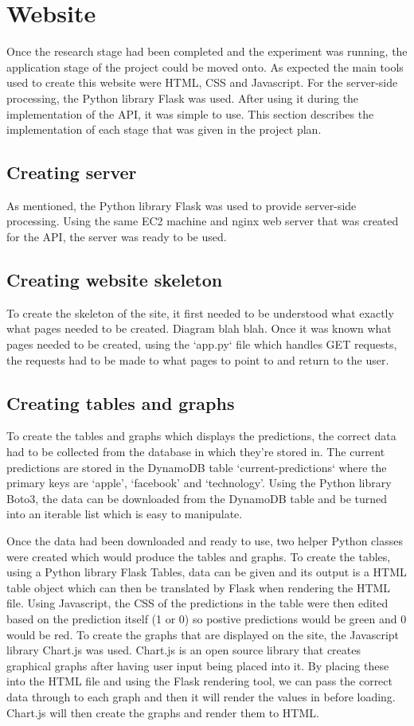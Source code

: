 \documentclass[a4paper,11pt]{report}
\begin{document}
\section{Website}
Once the research stage had been completed and the experiment was running, the application stage of the project could be moved onto. As expected the main tools used to create this website were HTML, CSS and Javascript. For the server-side processing, the Python library Flask was used. After using it during the implementation of the API, it was simple to use. This section describes the implementation of each stage that was given in the project plan.

\subsection{Creating server}
As mentioned, the Python library Flask was used to provide server-side processing. Using the same EC2 machine and nginx web server that was created for the API, the server was ready to be used.

\subsection{Creating website skeleton}
To create the skeleton of the site, it first needed to be understood what exactly what pages needed to be created. Diagram blah blah. Once it was known what pages needed to be created, using the `app.py` file which handles GET requests, the requests had to be made to what pages to point to and return to the user.

\subsection{Creating tables and graphs}
To create the tables and graphs which displays the predictions, the correct data had to be collected from the database in which they're stored in. The current predictions are stored in the DynamoDB table `current-predictions` where the primary keys are `apple', `facebook' and `technology'. Using the Python library Boto3, the data can be downloaded from the DynamoDB table and be turned into an iterable list which is easy to manipulate.

Once the data had been downloaded and ready to use, two helper Python classes were created which would produce the tables and graphs. To create the tables, using a Python library Flask Tables, data can be given and its output is a HTML table object which can then be translated by Flask when rendering the HTML file. Using Javascript, the CSS of the predictions in the table were then edited based on the prediction itself (1 or 0) so postive predictions would be green and 0 would be red. To create the graphs that are displayed on the site, the Javascript library Chart.js was used. Chart.js is an open source library that creates graphical graphs after having user input being placed into it. By placing these into the HTML file and using the Flask rendering tool, we can pass the correct data through to each graph and then it will render the values in before loading. Chart.js will then create the graphs and render them to HTML.
\end{document}
